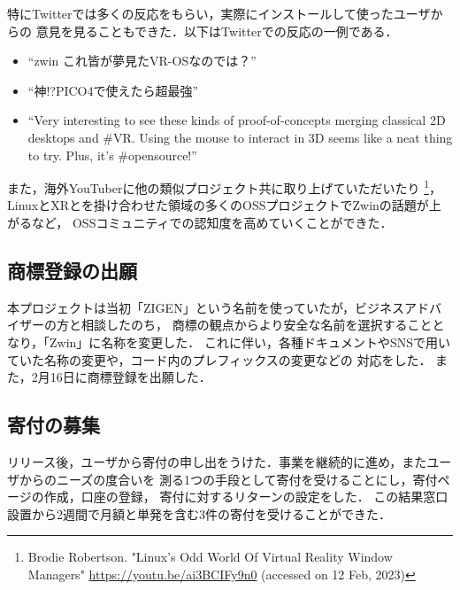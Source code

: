 特にTwitterでは多くの反応をもらい，実際にインストールして使ったユーザからの
意見を見ることもできた．以下はTwitterでの反応の一例である．

\begin{itemize}
  \item ``zwin これ皆が夢見たVR-OSなのでは？''
  \item ``神!?PICO4で使えたら超最強''
  \item ``Very interesting to see these kinds of proof-of-concepts merging classical 2D desktops and \#VR. Using the mouse to interact in 3D seems like a neat thing to try. Plus, it's \#opensource!''
\end{itemize}

また，海外YouTuberに他の類似プロジェクト共に取り上げていただいたり
\footnote{Brodie Robertson. "Linux's Odd World Of Virtual Reality Window Managers" \url{https://youtu.be/ai3BCIFy9n0} (accessed on 12 Feb, 2023)}，
LinuxとXRとを掛け合わせた領域の多くのOSSプロジェクトでZwinの話題が上がるなど，
OSSコミュニティでの認知度を高めていくことができた．


\subsection{商標登録の出願}

本プロジェクトは当初「ZIGEN」という名前を使っていたが，ビジネスアドバイザーの方と相談したのち，
商標の観点からより安全な名前を選択することとなり，「Zwin」に名称を変更した．
これに伴い，各種ドキュメントやSNSで用いていた名称の変更や，コード内のプレフィックスの変更などの
対応をした．
また，2月16日に商標登録を出願した．


\subsection{寄付の募集}

リリース後，ユーザから寄付の申し出をうけた．事業を継続的に進め，またユーザからのニーズの度合いを
測る1つの手段として寄付を受けることにし，寄付ページの作成，口座の登録，
寄付に対するリターンの設定をした．
この結果窓口設置から2週間で月額と単発を含む3件の寄付を受けることができた．

